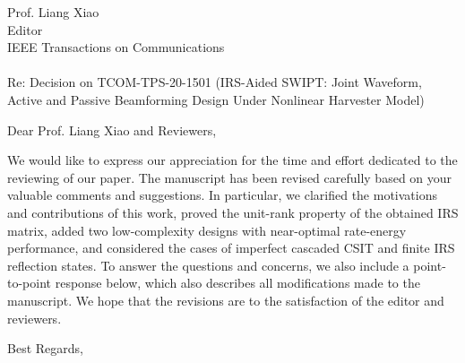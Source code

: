 \documentclass[a4paper, 10pt]{letter}
\date{}
\begin{document}
	\begin{letter}{Prof. Liang Xiao \\ Editor \\ IEEE Transactions on Communications \\ ~ \\ Re: Decision on TCOM-TPS-20-1501 (IRS-Aided SWIPT: Joint Waveform, Active and Passive Beamforming Design Under Nonlinear Harvester Model)}
		\opening{Dear Prof. Liang Xiao and Reviewers,}

		We would like to express our appreciation for the time and effort dedicated to the reviewing of our paper. The manuscript has been revised carefully based on your valuable comments and suggestions. In particular, we clarified the motivations and contributions of this work, proved the unit-rank property of the obtained IRS matrix, added two low-complexity designs with near-optimal rate-energy performance, and considered the cases of imperfect cascaded CSIT and finite IRS reflection states. To answer the questions and concerns, we also include a point-to-point response below, which also describes all modifications made to the manuscript. We hope that the revisions are to the satisfaction of the editor and reviewers.

		\closing{Best Regards,}
	\end{letter}
\end{document}
